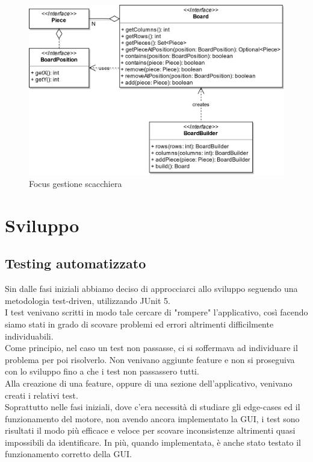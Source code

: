 \documentclass[a4paper,12pt]{report}
\begin{document}
\
\begin{figure}[H]
    \begin{center}
        \centering
        \includegraphics[scale=0.9]{img/Stefano/Board.png}
    \end{center}
    \caption{Focus gestione scacchiera}
    \label{img:Board}
\end{figure}
%

\chapter{Sviluppo}
\section{Testing automatizzato}

Sin dalle fasi iniziali abbiamo deciso di approcciarci allo sviluppo seguendo una metodologia test-driven, utilizzando JUnit 5.
\\
I test venivano scritti in modo tale cercare di "rompere" l'applicativo, così facendo siamo stati in grado di scovare problemi ed errori altrimenti difficilmente individuabili.
\\
Come principio, nel caso un test non passasse, ci si soffermava ad individuare il problema per poi risolverlo. Non venivano aggiunte feature e non si proseguiva con lo sviluppo fino a che i test non passassero tutti.\\
Alla creazione di una feature, oppure di una sezione dell'applicativo, venivano creati i relativi test.
\\
Soprattutto nelle fasi iniziali, dove c'era necessità di studiare gli edge-cases ed il funzionamento del motore, non avendo ancora implementato la GUI, i test sono risultati il modo più efficace e veloce per scovare inconsistenze altrimenti quasi impossibili da identificare. In più, quando implementata, è anche stato testato il funzionamento corretto della GUI.
\end{document}
